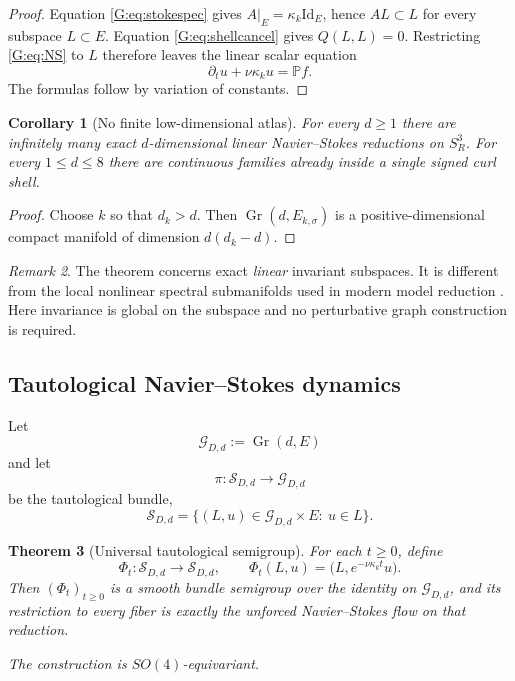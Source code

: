 \documentclass[
 aps,
 prd,
 reprint,
 amsmath,
 amssymb,
 nofootinbib,
 superscriptaddress
]{revtex4-2}
\newtheorem{theorem}{Theorem}[section]
\newtheorem{corollary}[theorem]{Corollary}
\theoremstyle{definition}
\theoremstyle{remark}
\newtheorem{remark}[theorem]{Remark}
\newcommand{\Sthree}{S^3_R}
\newcommand{\PP}{\mathbb P}
\newcommand{\cG}{\mathcal G}
\newcommand{\cS}{\mathscr S}
\newcommand{\Id}{\mathrm{Id}}
\newcommand{\Gr}{\operatorname{Gr}}
\begin{document}
\begin{proof}
Equation \eqref{G:eq:stokespec} gives
$A|_E=\kappa_k\Id_E$, hence $AL\subset L$ for every subspace $L\subset E$.
Equation \eqref{G:eq:shellcancel} gives $Q(L,L)=0$.  Restricting
\eqref{G:eq:NS} to $L$ therefore leaves the linear scalar equation
\[
        \partial_tu+\nu\kappa_k u=\PP f.
\]
The formulas follow by variation of constants.
\end{proof}

\begin{corollary}[No finite low-dimensional atlas]
\label{G:cor:nofiniteatlas}
For every $d\ge1$ there are infinitely many exact $d$-dimensional linear
Navier--Stokes reductions on $\Sthree$.  For every $1\le d\le8$ there are
continuous families already inside a single signed curl shell.
\end{corollary}

\begin{proof}
Choose $k$ so that $d_k>d$.  Then
$\Gr(d,E_{k,\sigma})$ is a positive-dimensional compact manifold of
dimension $d(d_k-d)$.
\end{proof}

\begin{remark}
The theorem concerns exact \emph{linear} invariant subspaces.  It is
different from the local nonlinear spectral submanifolds used in modern
model reduction \cite{Buza2023}.  Here invariance is global on the subspace
and no perturbative graph construction is required.
\end{remark}

\subsection{Tautological Navier--Stokes dynamics}

Let
\[
 \cG_{D,d}:=\Gr(d,E)
\]
and let
\[
 \pi:\cS_{D,d}\longrightarrow\cG_{D,d}
\]
be the tautological bundle,
\[
 \cS_{D,d}
 =
 \{(L,u)\in\cG_{D,d}\times E:\ u\in L\}.
\]

\begin{theorem}[Universal tautological semigroup]
\label{G:thm:tautological}
For each $t\ge0$, define
\begin{equation}
 \Phi_t:\cS_{D,d}\longrightarrow\cS_{D,d},
 \qquad
 \Phi_t(L,u)
 =
 \bigl(L,e^{-\nu\kappa_k t}u\bigr).
 \label{G:eq:tautflow}
\end{equation}
Then $(\Phi_t)_{t\ge0}$ is a smooth bundle semigroup over the identity on
$\cG_{D,d}$, and its restriction to every fiber is exactly the unforced
Navier--Stokes flow on that reduction.

The construction is $SO(4)$-equivariant.
\end{theorem}
\end{document}
